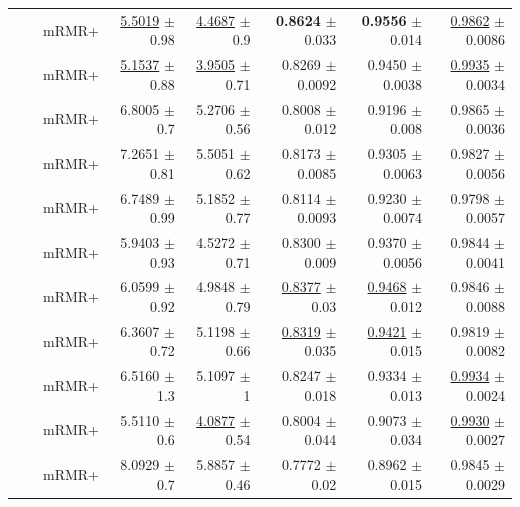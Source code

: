 \begin{longtable}{llp{}rrrrr}
 &  & mRMR+ & \underline{5.5019} {\scriptsize $\pm$ 0.98} & \underline{4.4687} {\scriptsize $\pm$ 0.9} & \textbf{0.8624} {\scriptsize $\pm$ 0.033} & \textbf{0.9556} {\scriptsize $\pm$ 0.014} & \underline{0.9862} {\scriptsize $\pm$ 0.0086} \\
 &  & mRMR+ & \underline{5.1537} {\scriptsize $\pm$ 0.88} & \underline{3.9505} {\scriptsize $\pm$ 0.71} & 0.8269 {\scriptsize $\pm$ 0.0092} & 0.9450 {\scriptsize $\pm$ 0.0038} & \underline{0.9935} {\scriptsize $\pm$ 0.0034} \\
 &  & mRMR+ & 6.8005 {\scriptsize $\pm$ 0.7} & 5.2706 {\scriptsize $\pm$ 0.56} & 0.8008 {\scriptsize $\pm$ 0.012} & 0.9196 {\scriptsize $\pm$ 0.008} & 0.9865 {\scriptsize $\pm$ 0.0036} \\
 &  & mRMR+ & 7.2651 {\scriptsize $\pm$ 0.81} & 5.5051 {\scriptsize $\pm$ 0.62} & 0.8173 {\scriptsize $\pm$ 0.0085} & 0.9305 {\scriptsize $\pm$ 0.0063} & 0.9827 {\scriptsize $\pm$ 0.0056} \\
 &  & mRMR+ & 6.7489 {\scriptsize $\pm$ 0.99} & 5.1852 {\scriptsize $\pm$ 0.77} & 0.8114 {\scriptsize $\pm$ 0.0093} & 0.9230 {\scriptsize $\pm$ 0.0074} & 0.9798 {\scriptsize $\pm$ 0.0057} \\
 &  & mRMR+ & 5.9403 {\scriptsize $\pm$ 0.93} & 4.5272 {\scriptsize $\pm$ 0.71} & 0.8300 {\scriptsize $\pm$ 0.009} & 0.9370 {\scriptsize $\pm$ 0.0056} & 0.9844 {\scriptsize $\pm$ 0.0041} \\
 &  & mRMR+ & 6.0599 {\scriptsize $\pm$ 0.92} & 4.9848 {\scriptsize $\pm$ 0.79} & \underline{0.8377} {\scriptsize $\pm$ 0.03} & \underline{0.9468} {\scriptsize $\pm$ 0.012} & 0.9846 {\scriptsize $\pm$ 0.0088} \\
 &  & mRMR+ & 6.3607 {\scriptsize $\pm$ 0.72} & 5.1198 {\scriptsize $\pm$ 0.66} & \underline{0.8319} {\scriptsize $\pm$ 0.035} & \underline{0.9421} {\scriptsize $\pm$ 0.015} & 0.9819 {\scriptsize $\pm$ 0.0082} \\
 &  & mRMR+ & 6.5160 {\scriptsize $\pm$ 1.3} & 5.1097 {\scriptsize $\pm$ 1} & 0.8247 {\scriptsize $\pm$ 0.018} & 0.9334 {\scriptsize $\pm$ 0.013} & \underline{0.9934} {\scriptsize $\pm$ 0.0024} \\
 &  & mRMR+ & 5.5110 {\scriptsize $\pm$ 0.6} & \underline{4.0877} {\scriptsize $\pm$ 0.54} & 0.8004 {\scriptsize $\pm$ 0.044} & 0.9073 {\scriptsize $\pm$ 0.034} & \underline{0.9930} {\scriptsize $\pm$ 0.0027} \\
 &  & mRMR+ & 8.0929 {\scriptsize $\pm$ 0.7} & 5.8857 {\scriptsize $\pm$ 0.46} & 0.7772 {\scriptsize $\pm$ 0.02} & 0.8962 {\scriptsize $\pm$ 0.015} & 0.9845 {\scriptsize $\pm$ 0.0029} \\

\end{longtable}

